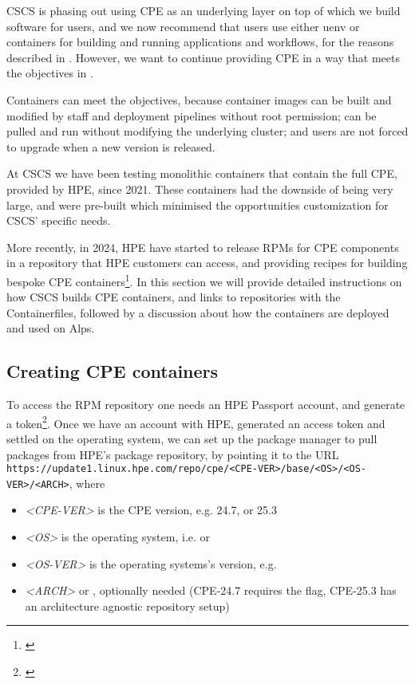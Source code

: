 CSCS is phasing out using CPE as an underlying layer on top of which we build software for users, and we now recommend that users use either uenv or containers for building and running applications and workflows, for the reasons described in .
However, we want to continue providing CPE in a way that meets the objectives in .

Containers can meet the objectives, because container images can be built and modified by staff and deployment pipelines without root permission; can be pulled and run without modifying the underlying cluster; and users are not forced to upgrade when a new version is released.

At CSCS we have been testing monolithic containers that contain the full CPE, provided by HPE, since 2021.
These containers had the downside of being very large, and were pre-built which minimised the opportunities customization for CSCS' specific needs.

More recently, in 2024, HPE have started to release RPMs for CPE components in a repository that HPE customers can access, and providing recipes for building bespoke CPE containers\footnote{\href{https://cpe.ext.hpe.com/docs/latest/install/installation-guidance-container.html}{}}.
In this section we will provide detailed instructions on how CSCS builds CPE containers, and links to repositories with the Containerfiles, followed by a discussion about how the containers are deployed and used on Alps.

\subsection{Creating CPE containers}
\label{sec:cpe-container-create}
To access the RPM repository one needs an HPE Passport account, and generate a token\footnote{\href{https://cpe.ext.hpe.com/docs/latest/install/token-authed-repo.html}{}}.
Once we have an account with HPE, generated an access token and settled on the operating system, we can set up the package manager to pull packages from HPE's package repository, by pointing it to the URL \lstinline{https://update1.linux.hpe.com/repo/cpe/<CPE-VER>/base/<OS>/<OS-VER>/<ARCH>}, where

\begin{itemize}
    \item \emph{\textless CPE-VER\textgreater} is the CPE version, e.g. 24.7, or 25.3
    \item \emph{\textless OS\textgreater} is the operating system, i.e.  or 
    \item \emph{\textless OS-VER\textgreater} is the operating systems's version, e.g. 
    \item \emph{\textless ARCH\textgreater}  or , optionally needed (CPE-24.7 requires the flag, CPE-25.3 has an architecture agnostic repository setup)
\end{itemize}


